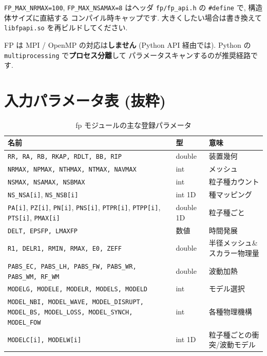 \documentclass[11pt,a4paper]{report}
\begin{document}
\begin{faq}[Q. 大規模メッシュが欲しい]
\texttt{FP\_MAX\_NRMAX=100}, \texttt{FP\_MAX\_NSAMAX=8} はヘッダ
\texttt{fp/fp\_api.h} の \texttt{\#define} で, 構造体サイズに直結する
コンパイル時キャップです. 大きくしたい場合は書き換えて
\texttt{libfpapi.so} を再ビルドしてください.
\end{faq}

\begin{faq}[Q. 複数コアを使いたい]
FP は MPI / OpenMP の対応は\textbf{しません} (Python API 経由では).
Python の \texttt{multiprocessing} で\textbf{プロセス分離}して
パラメータスキャンするのが推奨経路です.
\end{faq}

\section{入力パラメータ表 (抜粋)}

\begin{longtable}{@{}p{3cm}p{2.2cm}p{9.2cm}@{}}
\caption{fp モジュールの主な登録パラメータ}\\
\toprule
\textbf{名前} & \textbf{型} & \textbf{意味} \\ \midrule \endhead
\texttt{RR, RA, RB, RKAP, RDLT, BB, RIP} & double & 装置幾何 \\
\texttt{NRMAX, NPMAX, NTHMAX, NTMAX, NAVMAX} & int & メッシュ \\
\texttt{NSMAX, NSAMAX, NSBMAX} & int & 粒子種カウント \\
\texttt{NS\_NSA[i]}, \texttt{NS\_NSB[i]} & int 1D & 種マッピング \\
\texttt{PA[i]}, \texttt{PZ[i]}, \texttt{PN[i]}, \texttt{PNS[i]}, \texttt{PTPR[i]}, \texttt{PTPP[i]}, \texttt{PTS[i]}, \texttt{PMAX[i]} & double 1D & 粒子種ごと \\
\texttt{DELT, EPSFP, LMAXFP} & 数値 & 時間発展 \\
\texttt{R1, DELR1, RMIN, RMAX, E0, ZEFF} & double & 半径メッシュ\& スカラー物理量 \\
\texttt{PABS\_EC, PABS\_LH, PABS\_FW, PABS\_WR, PABS\_WM, RF\_WM} & double & 波動加熱 \\
\texttt{MODELG, MODELE, MODELR, MODELS, MODELD} & int & モデル選択 \\
\texttt{MODEL\_NBI, MODEL\_WAVE, MODEL\_DISRUPT, MODEL\_BS, MODEL\_LOSS, MODEL\_SYNCH, MODEL\_FOW} & int & 各種物理機構 \\
\texttt{MODELC[i], MODELW[i]} & int 1D & 粒子種ごとの衝突/波動モデル \\
\bottomrule
\end{longtable}
\end{document}
